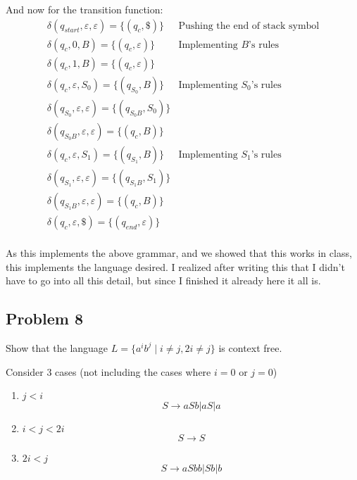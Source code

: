 \documentclass[english]{article}
\begin{document}
And now for the transition function:
\begin{align*}
\delta(q_{start},\varepsilon,\varepsilon) = \{(q_{c},\$)\} & \textrm{Pushing the end of stack symbol} \\
\delta(q_{c},0,B) = \{(q_{c},\varepsilon)\} & \textrm{Implementing $B$'s rules} \\
\delta(q_{c},1,B) = \{(q_{c},\varepsilon)\}  \\
\delta(q_{c},\varepsilon,S_0) = \{(q_{S_0},B)\} & \textrm{Implementing $S_0$'s rules} \\
\delta(q_{S_0},\varepsilon,\varepsilon) = \{(q_{S_0B},S_0)\}  \\
\delta(q_{S_0B},\varepsilon,\varepsilon) = \{(q_{c},B)\}  \\
\delta(q_{c},\varepsilon,S_1) = \{(q_{S_1},B)\} & \textrm{Implementing $S_1$'s rules} \\
\delta(q_{S_1},\varepsilon,\varepsilon) = \{(q_{S_1B},S_1)\}  \\
\delta(q_{S_1B},\varepsilon,\varepsilon) = \{(q_{c},B)\}  \\
\delta(q_{c},\varepsilon,\$) = \{(q_{end},\varepsilon)\}  \\
\end{align*}

As this implements the above grammar, and we showed that this works in class, this implements the language
desired. I realized after writing this that I didn't have to go into all this detail, but since I finished
it already here it all is.

\subsection*{Problem 8}
Show that the language \(L = \{a^i b^j \mid i \neq j, 2i \neq j\}\) is context free.

Consider 3 cases (not including the cases where $i=0$ or $j=0$)
\begin{enumerate}
\item \(j < i\)
\[ S \rightarrow aSb | aS | a \]

\item \(i < j < 2i\)
\[ S \rightarrow  S \] %

\item \(2i < j\)
\[ S \rightarrow aSbb | Sb | b \]

\end{enumerate}
\end{document}
